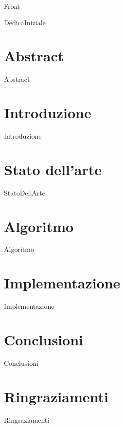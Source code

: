 \documentclass[12pt,onesidet]{report}
\begin{document}
	
	\begin{titlepage}
		{Front}
	\end{titlepage}

	{DedicaIniziale}
    
    
    \chapter*{Abstract}
    {Abstract}
    
    \tableofcontents{}
    \listoftables
    \listoflistings
    \newpage
    
    
    \chapter{Introduzione}
    {Introduzione}
    
    \chapter{Stato dell'arte}
    {StatoDellArte}
    
    \chapter{Algoritmo}
    {Algoritmo}
    
    \chapter{Implementazione}
    {Implementazione}
    
    \chapter{Conclusioni}
     {Conclusioni}
     
    \chapter{Ringraziamenti}
    {Ringraziamenti}
    
     
    
    
\end{document}
